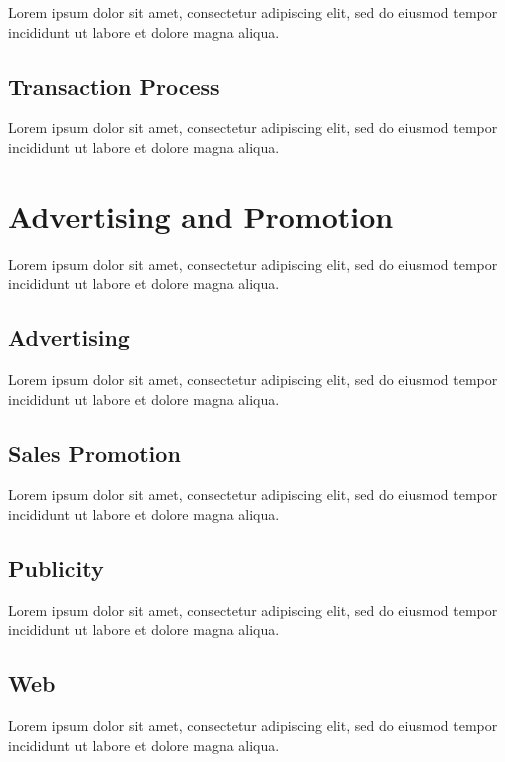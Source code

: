 Lorem ipsum dolor sit amet, consectetur adipiscing elit, sed do eiusmod tempor incididunt ut labore et dolore magna aliqua.

\subsection{Transaction Process}

Lorem ipsum dolor sit amet, consectetur adipiscing elit, sed do eiusmod tempor incididunt ut labore et dolore magna aliqua.


\section{Advertising and Promotion}

Lorem ipsum dolor sit amet, consectetur adipiscing elit, sed do eiusmod tempor incididunt ut labore et dolore magna aliqua.

\subsection{Advertising}

Lorem ipsum dolor sit amet, consectetur adipiscing elit, sed do eiusmod tempor incididunt ut labore et dolore magna aliqua.

\subsection{Sales Promotion}

Lorem ipsum dolor sit amet, consectetur adipiscing elit, sed do eiusmod tempor incididunt ut labore et dolore magna aliqua.

\subsection{Publicity}

Lorem ipsum dolor sit amet, consectetur adipiscing elit, sed do eiusmod tempor incididunt ut labore et dolore magna aliqua.

\subsection{Web}

Lorem ipsum dolor sit amet, consectetur adipiscing elit, sed do eiusmod tempor incididunt ut labore et dolore magna aliqua.
